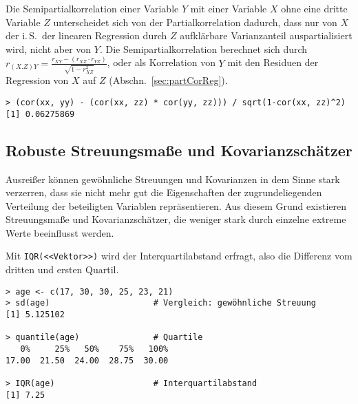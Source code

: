 Die Semipartialkorrelation einer Variable $Y$ mit einer Variable $X$ ohne eine dritte Variable $Z$ unterscheidet sich von der Partialkorrelation dadurch, dass nur von $X$ der i.\,S.\ der linearen Regression durch $Z$ aufklärbare Varianzanteil auspartialisiert wird, nicht aber von $Y$. Die Semipartialkorrelation berechnet sich durch $r_{(X.Z)Y} = \frac{r_{XY} - (r_{XZ} \cdot r_{YZ})}{\sqrt{1-r_{XZ}^{2}}}$, oder als Korrelation von $Y$ mit den Residuen der Regression von $X$ auf $Z$ (Abschn.\ \ref{sec:partCorReg}).
\begin{lstlisting}
> (cor(xx, yy) - (cor(xx, zz) * cor(yy, zz))) / sqrt(1-cor(xx, zz)^2)
[1] 0.06275869
\end{lstlisting}

\subsection{Robuste Streuungsmaße und Kovarianzschätzer}
\label{sec:varRob}

Ausreißer können gewöhnliche Streuungen und Kovarianzen in dem Sinne stark verzerren, dass sie nicht mehr gut die Eigenschaften der zugrundeliegenden Verteilung der beteiligten Variablen repräsentieren. Aus diesem Grund existieren Streuungsmaße und Kovarianzschätzer, die weniger stark durch einzelne extreme Werte beeinflusst werden.

Mit \lstinline!IQR(<<Vektor>>)! wird der Interquartilabstand erfragt, also die Differenz vom dritten und ersten Quartil.
\begin{lstlisting}
> age <- c(17, 30, 30, 25, 23, 21)
> sd(age)                     # Vergleich: gewöhnliche Streuung
[1] 5.125102

> quantile(age)               # Quartile
   0%     25%   50%    75%   100%
17.00  21.50  24.00  28.75  30.00

> IQR(age)                    # Interquartilabstand
[1] 7.25
\end{lstlisting}

